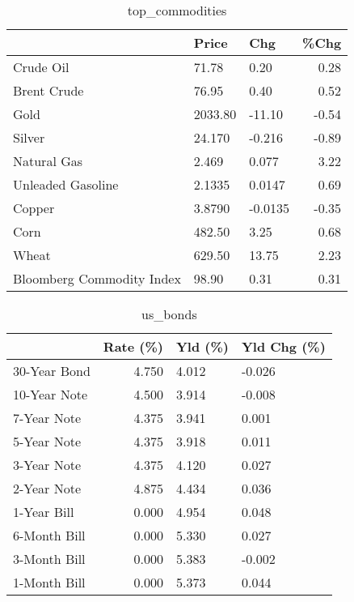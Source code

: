 \documentclass{article}%
\begin{document}
\begin{table}[htbp]%
\caption{top\_commodities}%
\centering%
\begin{adjustbox}{width=1\textwidth}%
\begin{tabular}{lllr}
\toprule
                          &   Price &     Chg &  \%Chg \\
\midrule
               Crude Oil  &   71.78 &    0.20 &  0.28 \\
             Brent Crude  &   76.95 &    0.40 &  0.52 \\
                    Gold  & 2033.80 &  -11.10 & -0.54 \\
                  Silver  &  24.170 &  -0.216 & -0.89 \\
             Natural Gas  &   2.469 &   0.077 &  3.22 \\
       Unleaded Gasoline  &  2.1335 &  0.0147 &  0.69 \\
                  Copper  &  3.8790 & -0.0135 & -0.35 \\
                    Corn  &  482.50 &    3.25 &  0.68 \\
                   Wheat  &  629.50 &   13.75 &  2.23 \\
Bloomberg Commodity Index &   98.90 &    0.31 &  0.31 \\
\bottomrule
\end{tabular}
%
\end{adjustbox}%
\end{table}

%


\begin{table}[htbp]%
\caption{us\_bonds}%
\centering%
\begin{adjustbox}{width=1\textwidth}%
\begin{tabular}{lrll}
\toprule
             &  Rate (\%) & Yld (\%) & Yld Chg (\%) \\
\midrule
30-Year Bond &     4.750 &   4.012 &      -0.026 \\
10-Year Note &     4.500 &   3.914 &      -0.008 \\
 7-Year Note &     4.375 &   3.941 &       0.001 \\
 5-Year Note &     4.375 &   3.918 &       0.011 \\
 3-Year Note &     4.375 &   4.120 &       0.027 \\
 2-Year Note &     4.875 &   4.434 &       0.036 \\
 1-Year Bill &     0.000 &   4.954 &       0.048 \\
6-Month Bill &     0.000 &   5.330 &       0.027 \\
3-Month Bill &     0.000 &   5.383 &      -0.002 \\
1-Month Bill &     0.000 &   5.373 &       0.044 \\
\bottomrule
\end{tabular}
%
\end{adjustbox}%
\end{table}
\end{document}
